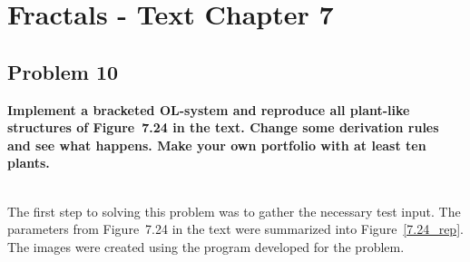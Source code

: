 
\chapter{Fractals - Text Chapter 7}

\section{Problem 10}
\textbf{
Implement a bracketed OL-system and reproduce all plant-like structures of Figure~7.24 in the text. Change some derivation rules and see what happens. Make your own portfolio with at least ten plants.
}

\hfill \\

The first step to solving this problem was to gather the necessary test input. The parameters from Figure~7.24 in the text were summarized into Figure~\ref{7.24_rep}. The images were created using the program developed for the problem.

